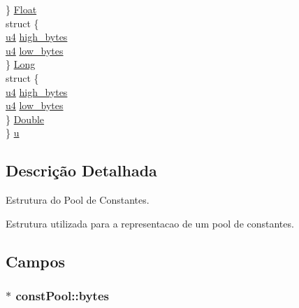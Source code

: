 \begin{DoxyCompactItemize}
\begin{tabbing}
\>\} \hyperlink{structconst_pool_aaba15c27d5b0f572a54d68643aa577fa}{Float}\\
\>struct \{\\
\>\>\hyperlink{_e___l_e_c_l_a_s_s_8h_aedf6ddc03df8caaaccbb4c60b9a9b850}{u4} \hyperlink{structconst_pool_a5c4154d878bdc78c47829c3003008bcd}{high\_bytes}\\
\>\>\hyperlink{_e___l_e_c_l_a_s_s_8h_aedf6ddc03df8caaaccbb4c60b9a9b850}{u4} \hyperlink{structconst_pool_a55d572db573fd39218d7e3233a7590fa}{low\_bytes}\\
\>\} \hyperlink{structconst_pool_a2ff4c34ed23a88cc0e355b0111ce8957}{Long}\\
\>struct \{\\
\>\>\hyperlink{_e___l_e_c_l_a_s_s_8h_aedf6ddc03df8caaaccbb4c60b9a9b850}{u4} \hyperlink{structconst_pool_a5c4154d878bdc78c47829c3003008bcd}{high\_bytes}\\
\>\>\hyperlink{_e___l_e_c_l_a_s_s_8h_aedf6ddc03df8caaaccbb4c60b9a9b850}{u4} \hyperlink{structconst_pool_a55d572db573fd39218d7e3233a7590fa}{low\_bytes}\\
\>\} \hyperlink{structconst_pool_a860c917cdbc43a11bbe5411a3329129a}{Double}\\
\} \hyperlink{structconst_pool_ab327fbd2fec182d523b180c4d941d7f5}{u}\\

\end{tabbing}\end{DoxyCompactItemize}


\subsection{Descrição Detalhada}
Estrutura do Pool de Constantes. 

Estrutura utilizada para a representacao de um pool de constantes. 

\subsection{Campos}
\hypertarget{structconst_pool_ae5e4f8056a2790c12bc61d9ba0582050}{}
\subsubsection[{bytes}]{$\ast$ const\+Pool\+::bytes}\label{structconst_pool_ae5e4f8056a2790c12bc61d9ba0582050}


